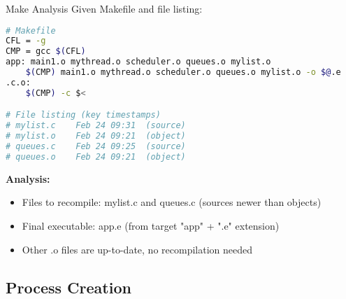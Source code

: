 \begin{example2}{Make Analysis}
    Given Makefile and file listing:
    
\begin{lstlisting}[language=bash, style=basesmol]
# Makefile
CFL = -g
CMP = gcc $(CFL)
app: main1.o mythread.o scheduler.o queues.o mylist.o
    $(CMP) main1.o mythread.o scheduler.o queues.o mylist.o -o $@.e
.c.o:
    $(CMP) -c $<

# File listing (key timestamps)
# mylist.c    Feb 24 09:31  (source)
# mylist.o    Feb 24 09:21  (object)
# queues.c    Feb 24 09:25  (source)  
# queues.o    Feb 24 09:21  (object)
\end{lstlisting}

    \tcblower
    
    \textbf{Analysis:}
    \begin{itemize}
        \item Files to recompile: mylist.c and queues.c (sources newer than objects)
        \item Final executable: app.e (from target "app" + ".e" extension)
        \item Other .o files are up-to-date, no recompilation needed
    \end{itemize}
\end{example2}

\subsection{Process Creation}

